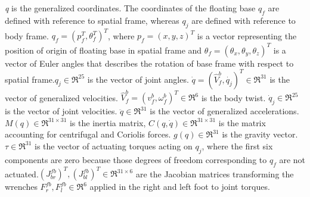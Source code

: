 \documentclass[12pt]{article}
\begin{document}
\emph{q} is the generalized coordinates. The coordinates of the floating base $q_{f}$ are defined with reference to spatial frame, whereas $q_{j}$ are defined with reference to body frame. $q_{f} = (p_{f}^{T},\theta_{f}^{T})^{T}$, where $p_{f}=(x,y,z)^{T}$ is a vector representing  the position of origin of floating base in spatial frame and $\theta_{f}=(\theta_{x},\theta_{y},\theta_{z})^{T}$ is a vector of Euler angles that describes the rotation of base frame with respect to spatial frame.$q_{j} \in \Re^{25}$ is the vector of joint angles. $\dot{q} =  (\hat{V}_{f}^{b},\dot{q_{j}})^{T} \in \Re^{31}$ is the vector of generalized velocities. $\hat{V}_{f}^{b} = (v_f^b,\omega_f^b)^T \in \Re^{6}$ is the body twist. $\dot{q}_{j} \in \Re^{25}$ is the vector of joint velocities. $\ddot{q}\in \Re^{31}$ is the vector of generalized accelerations. $M(q)\in \Re^{31 \times 31}$ is the inertia matrix, $C(q,\dot{q})\in \Re^{31 \times 31}$ is the matrix accounting for centrifugal and Coriolis forces. $g(q) \in \Re^{31}$ is the gravity vector. $\tau \in \Re^{31}$ is the vector of actuating torques acting on $q_{j}$, where the first six components are zero because those degrees of freedom corresponding to $q_{f}$ are not actuated.$(J_{br}^{fb})^{T},(J_{bl}^{fb})^{T} \in \Re^{31 \times 6}$ are the Jacobian matrices transforming the wrenches $F_{r}^{fb},F_{l}^{fb} \in \Re^{6}$ applied in the right and left foot to joint torques.
\end{document}
